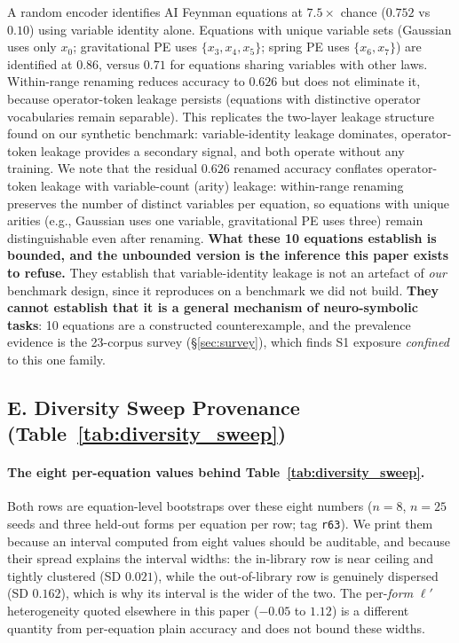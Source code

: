 A random encoder identifies AI Feynman equations at $7.5\times$ chance ($0.752$ vs $0.10$) using variable identity alone. Equations with unique variable sets (Gaussian uses only $x_0$; gravitational PE uses $\{x_3, x_4, x_5\}$; spring PE uses $\{x_6, x_7\}$) are identified at $0.86$, versus $0.71$ for equations sharing variables with other laws. Within-range renaming reduces accuracy to $0.626$ but does not eliminate it, because operator-token leakage persists (equations with distinctive operator vocabularies remain separable). This replicates the two-layer leakage structure found on our synthetic benchmark: variable-identity leakage dominates, operator-token leakage provides a secondary signal, and both operate without any training. We note that the residual $0.626$ renamed accuracy conflates operator-token leakage with variable-count (arity) leakage: within-range renaming preserves the number of distinct variables per equation, so equations with unique arities (e.g., Gaussian uses one variable, gravitational PE uses three) remain distinguishable even after renaming. \textbf{What these 10 equations establish is bounded, and the unbounded version is the inference this paper exists to refuse.} They establish that variable-identity leakage is not an artefact of \emph{our} benchmark design, since it reproduces on a benchmark we did not build. \textbf{They cannot establish that it is a general mechanism of neuro-symbolic tasks}: 10 equations are a constructed counterexample, and the prevalence evidence is the 23-corpus survey (\S\ref{sec:survey}), which finds S1 exposure \emph{confined} to this one family.

\subsection*{E. Diversity Sweep Provenance (Table~\ref{tab:diversity_sweep})}


\paragraph{The eight per-equation values behind Table~\ref{tab:diversity_sweep}.} Both rows are
equation-level bootstraps over these eight numbers ($n{=}8$, $n{=}25$ seeds and three held-out
forms per equation per row; tag \texttt{r63}). We print them because an interval computed from
eight values should be auditable, and because their spread explains the interval widths: the
in-library row is near ceiling and tightly clustered (SD $0.021$), while the out-of-library row is
genuinely dispersed (SD $0.162$), which is why its interval is the wider of the two. The
per-\emph{form} $\ell'$ heterogeneity quoted elsewhere in this paper ($-0.05$ to $1.12$) is a
different quantity from per-equation plain accuracy and does not bound these widths.

